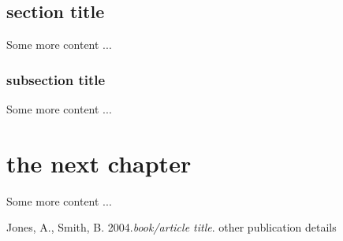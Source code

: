 \documentclass{pdfmx4020}
\begin{document}
\section{section title}
Some more content ...

\subsection{subsection title}
Some more content ...

\chapter{the next chapter}
Some more content ...

\begin{thebibliography}{999}

 Jones, A., Smith, B. 2004.\emph{book/article title}. other publication details

\end{thebibliography}
\end{document}
